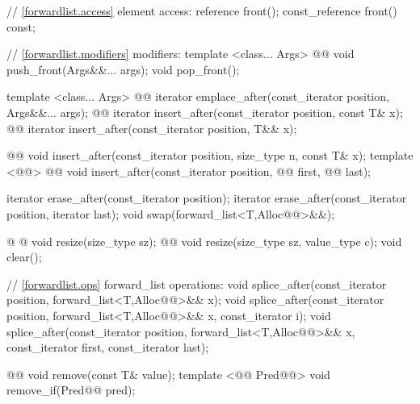 \documentclass[american,twoside]{book}
\begin{document}
\begin{codeblock}
{{    // \ref{forwardlist.access} element access: 
    reference front(); 
    const_reference front() const; 

    // \ref{forwardlist.modifiers} modifiers: 
    template <class... Args> 
      @@ 
      void push_front(Args&&... args); 
    void pop_front();
   
    template <class... Args> 
      @@ 
      iterator emplace_after(const_iterator position, Args&&... args);
    @@ 
      iterator insert_after(const_iterator position, const T& x);
    @@ 
      iterator insert_after(const_iterator position, T&& x);

    @@ 
      void insert_after(const_iterator position, size_type n, const T& x); 
    template <@@> 
      @@
      void insert_after(const_iterator position, @@ first, @@ last);

    iterator erase_after(const_iterator position); 
    iterator erase_after(const_iterator position, iterator last); 
    void swap(forward_list<T,Alloc@@>&&);

    @ @ void resize(size_type sz);
    @@ void resize(size_type sz, value_type c);
    void clear(); 

    // \ref{forwardlist.ops} forward_list operations: 
    void splice_after(const_iterator position, forward_list<T,Alloc@@>&& x); 
    void splice_after(const_iterator position, forward_list<T,Alloc@@>&& x,
                      const_iterator i); 
    void splice_after(const_iterator position, forward_list<T,Alloc@@>&& x,
                      const_iterator first, const_iterator last); 

    @@ void remove(const T& value); 
    template <@@ Pred@@> void remove_if(Pred@@ pred); 

}}
\end{codeblock}
\end{document}
